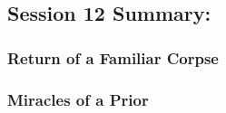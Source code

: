 \subsection{Session 12 Summary:}

\subsubsection{Return of a Familiar Corpse}



\subsubsection{Miracles of a Prior}
